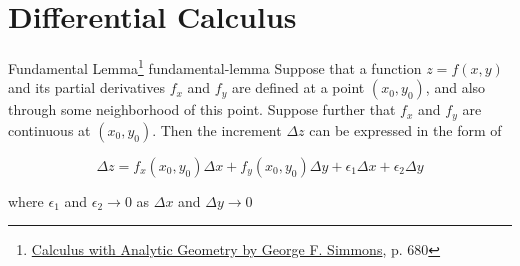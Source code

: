 \section{Differential Calculus}

\begin{Theorem}{
    Fundamental Lemma\footnote{\href{https://trello.com/c/byu9Pyy8}{Calculus with Analytic Geometry by George F. Simmons}, p. 680}
}{fundamental-lemma}
    Suppose that a function $z = f(x, y)$ and its partial derivatives $f_x$ and $f_y$ are defined at a point
    $(x_0, y_0)$, and also through some neighborhood of this point. Suppose further that $f_x$ and $f_y$ are continuous
    at $(x_0, y_0)$. Then the increment $\Delta z$ can be expressed in the form of

    \begin{equation}
        \Delta z = f_x(x_0, y_0)\Delta x + f_y(x_0, y_0)\Delta y + \epsilon_1\Delta x + \epsilon_2\Delta y
    \end{equation}

    where $\epsilon_1$ and $\epsilon_2 \rightarrow 0$ as $\Delta x$ and $\Delta y \rightarrow 0$
\end{Theorem}

